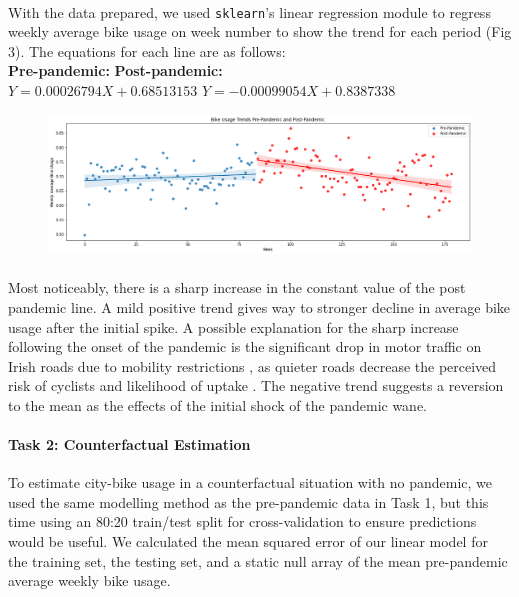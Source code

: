 \documentclass[11pt,letterpaper]{article}
\begin{document}
\paragraph{}
	With the data prepared, we used \texttt{sklearn}’s linear regression module to regress weekly average bike usage on week number to show the trend for each period (Fig 3). The equations for each line are as follows:\\
	\textbf{Pre-pandemic:} \hspace{4.6cm} \textbf{Post-pandemic:}\\
	$Y = 0.00026794X + 0.68513153$ \hspace{2.2cm} $Y = -0.00099054X + 0.8387338$
\begin{figure}[h]
	\centering
	\includegraphics[width=\textwidth]{comparison.png}
\end{figure}
\newpage
\paragraph{}
	Most noticeably, there is a sharp increase in the constant value of the post pandemic line. A mild positive trend gives way to stronger decline in average bike usage after the initial spike. A possible explanation for the sharp increase following the onset of the pandemic is the significant drop in motor traffic on Irish roads due to mobility restrictions \cite{traffic}, as quieter roads decrease the perceived risk of cyclists and likelihood of uptake \cite{risk}. The negative trend suggests a reversion to the mean as the effects of the initial shock of the pandemic wane.\\
\paragraph{Task 2: Counterfactual Estimation}
	To estimate city-bike usage in a counterfactual situation with no pandemic, we used the same modelling method as the pre-pandemic data in Task 1, but this time using an 80:20 train/test split for cross-validation to ensure predictions would be useful. We calculated the mean squared error of our linear model for the training set, the testing set, and a static null array of the mean pre-pandemic average weekly bike usage.
\end{document}
